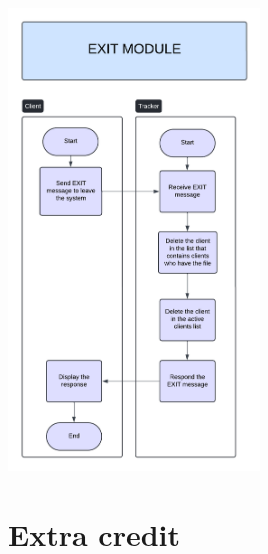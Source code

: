 \documentclass[a4paper]{article}
\begin{document}
\includegraphics[width=0.5\textwidth]{exit_module.png} 
\newpage

\section{Extra credit}
\end{document}
